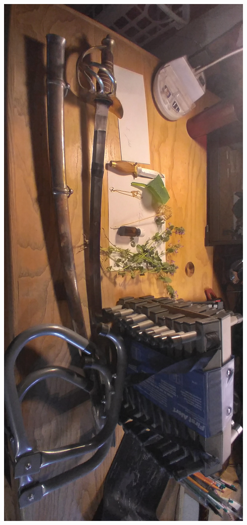 \documentclass{article}
\begin{document}
\begin{enumerate}
\begin{center}
            \includegraphics[max width=\textwidth - 6ex]{all_together_now}
        \end{center}
\end{enumerate}

\end{document}
